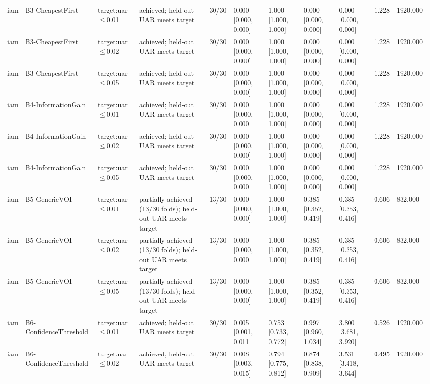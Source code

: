 \begin{table}[!ht]
{\begin{tabular}{lllllllllll}
iam & B3-CheapestFirst & target:uar$\le$0.01 & achieved; held-out UAR meets target & 30/30 & 0.000 [0.000, 0.000] & 1.000 [1.000, 1.000] & 0.000 [0.000, 0.000] & 0.000 [0.000, 0.000] & 1.228 & 1920.000 \\
iam & B3-CheapestFirst & target:uar$\le$0.02 & achieved; held-out UAR meets target & 30/30 & 0.000 [0.000, 0.000] & 1.000 [1.000, 1.000] & 0.000 [0.000, 0.000] & 0.000 [0.000, 0.000] & 1.228 & 1920.000 \\
iam & B3-CheapestFirst & target:uar$\le$0.05 & achieved; held-out UAR meets target & 30/30 & 0.000 [0.000, 0.000] & 1.000 [1.000, 1.000] & 0.000 [0.000, 0.000] & 0.000 [0.000, 0.000] & 1.228 & 1920.000 \\
iam & B4-InformationGain & target:uar$\le$0.01 & achieved; held-out UAR meets target & 30/30 & 0.000 [0.000, 0.000] & 1.000 [1.000, 1.000] & 0.000 [0.000, 0.000] & 0.000 [0.000, 0.000] & 1.228 & 1920.000 \\
iam & B4-InformationGain & target:uar$\le$0.02 & achieved; held-out UAR meets target & 30/30 & 0.000 [0.000, 0.000] & 1.000 [1.000, 1.000] & 0.000 [0.000, 0.000] & 0.000 [0.000, 0.000] & 1.228 & 1920.000 \\
iam & B4-InformationGain & target:uar$\le$0.05 & achieved; held-out UAR meets target & 30/30 & 0.000 [0.000, 0.000] & 1.000 [1.000, 1.000] & 0.000 [0.000, 0.000] & 0.000 [0.000, 0.000] & 1.228 & 1920.000 \\
iam & B5-GenericVOI & target:uar$\le$0.01 & partially achieved (13/30 folds); held-out UAR meets target & 13/30 & 0.000 [0.000, 0.000] & 1.000 [1.000, 1.000] & 0.385 [0.352, 0.419] & 0.385 [0.353, 0.416] & 0.606 & 832.000 \\
iam & B5-GenericVOI & target:uar$\le$0.02 & partially achieved (13/30 folds); held-out UAR meets target & 13/30 & 0.000 [0.000, 0.000] & 1.000 [1.000, 1.000] & 0.385 [0.352, 0.419] & 0.385 [0.353, 0.416] & 0.606 & 832.000 \\
iam & B5-GenericVOI & target:uar$\le$0.05 & partially achieved (13/30 folds); held-out UAR meets target & 13/30 & 0.000 [0.000, 0.000] & 1.000 [1.000, 1.000] & 0.385 [0.352, 0.419] & 0.385 [0.353, 0.416] & 0.606 & 832.000 \\
iam & B6-ConfidenceThreshold & target:uar$\le$0.01 & achieved; held-out UAR meets target & 30/30 & 0.005 [0.001, 0.011] & 0.753 [0.733, 0.772] & 0.997 [0.960, 1.034] & 3.800 [3.681, 3.920] & 0.526 & 1920.000 \\
iam & B6-ConfidenceThreshold & target:uar$\le$0.02 & achieved; held-out UAR meets target & 30/30 & 0.008 [0.003, 0.015] & 0.794 [0.775, 0.812] & 0.874 [0.838, 0.909] & 3.531 [3.418, 3.644] & 0.495 & 1920.000 \\

\end{tabular}}
\end{table}
